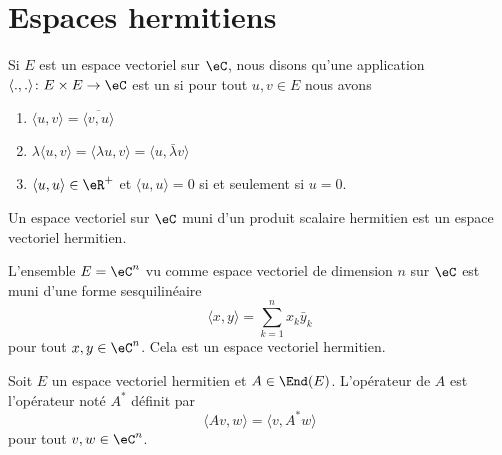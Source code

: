 
\section{Espaces hermitiens}

\begin{definition}  \label{DefMZQxmQ}
Si \( E\) est un espace vectoriel sur \( \eC\), nous disons qu'une application \( \langle ., .\rangle \colon E\times E\to \eC\) est un  si pour tout \( u,v\in E\) nous avons
\begin{enumerate}
    \item
        \( \langle u, v\rangle =\overline{ \langle v, u\rangle  }\)
    \item
        \( \lambda\langle u, v\rangle =\langle \lambda u, v\rangle =\langle u, \bar \lambda v\rangle \)
    \item
        \( \langle u, u\rangle \in \eR^+\) et \( \langle u, u\rangle =0\) si et seulement si \( u=0\).
\end{enumerate}
Un espace vectoriel sur \( \eC\) muni d'un produit scalaire hermitien est un espace vectoriel hermitien.
\end{definition}

\begin{example}
    L'ensemble \( E=\eC^n\) vu comme espace vectoriel de dimension \( n\) sur \( \eC\)  est muni d'une forme sesquilinéaire
    \begin{equation}    \label{EqFormSesqQrjyPH}
        \langle x, y\rangle =\sum_{k=1}^nx_k\bar y_k
    \end{equation}
    pour tout \( x,y\in\eC^n\). Cela est un espace vectoriel hermitien.
\end{example}

\begin{definition}
    Soit \( E\) un espace vectoriel hermitien et \( A\in\End(E)\). L'opérateur  de \( A\) est l'opérateur noté \( A^*\) définit par
    \begin{equation}    \label{EQooHWYKooFzAGgB}
        \langle Av, w\rangle =\langle v, A^*w\rangle 
    \end{equation}
    pour tout \( v,w\in \eC^n\).
\end{definition}

